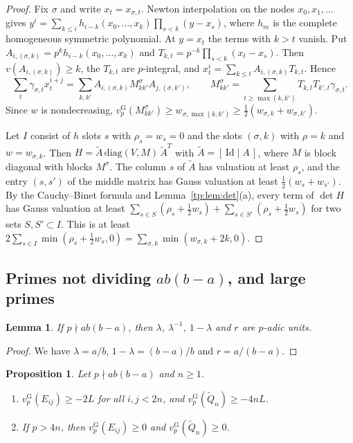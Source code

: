 \documentclass[11pt]{amsart}
\newtheorem{lemma}[theorem]{Lemma}
\newtheorem{proposition}[theorem]{Proposition}
\theoremstyle{definition}
\theoremstyle{remark}
\numberwithin{equation}{section}
\newcommand{\vG}{v_p^{\mathrm G}}
\begin{document}
\begin{proof}
Fix $\sigma$ and write $x_t=x_{\sigma,t}$. Newton interpolation on the nodes $x_0,x_1,\dots$ gives
$y^i=\sum_{k\le i}h_{i-k}(x_0,\dots,x_k)\prod_{s<k}(y-x_s)$, where $h_m$ is the complete homogeneous symmetric
polynomial. At $y=x_t$ the terms with $k>t$ vanish. Put $A_{i,(\sigma,k)}=p^kh_{i-k}(x_0,\dots,x_k)$ and
$T_{k,t}=p^{-k}\prod_{s<k}(x_t-x_s)$. Then $v(A_{i,(\sigma,k)})\ge k$, the $T_{k,t}$ are $p$-integral, and
$x_t^i=\sum_{k\le t}A_{i,(\sigma,k)}T_{k,t}$. Hence
\[
 \sum_t\gamma_{\sigma,t}x_t^{i+j}=\sum_{k,k'}A_{i,(\sigma,k)}M^\sigma_{kk'}A_{j,(\sigma,k')},\qquad
 M^\sigma_{kk'}=\sum_{t\ge\max(k,k')}T_{k,t}T_{k',t}\gamma_{\sigma,t}.
\]
Since $w$ is nondecreasing, $\vG(M^\sigma_{kk'})\ge w_{\sigma,\max(k,k')}\ge\frac12(w_{\sigma,k}+w_{\sigma,k'})$.

Let $I$ consist of $h$ slots $s$ with $\rho_s=w_s=0$ and the slots $(\sigma,k)$ with $\rho=k$ and $w=w_{\sigma,k}$. Then
$H=\tilde A\,\mathrm{diag}(V,M)\,\tilde A^{T}$ with $\tilde A=[\,\mathrm{Id}\mid A\,]$, where $M$ is block diagonal with
blocks $M^\sigma$. The column $s$ of $\tilde A$ has valuation at least $\rho_s$, and the entry $(s,s')$ of the middle
matrix has Gauss valuation at least $\frac12(w_s+w_{s'})$. By the Cauchy--Binet formula and
Lemma~\ref{tp:lem:det}(a), every term of $\det H$ has Gauss valuation at least
$\sum_{s\in S}(\rho_s+\frac12w_s)+\sum_{s\in S'}(\rho_s+\frac12w_s)$ for two sets $S,S'\subset I$. This is at least
$2\sum_{s\in I}\min(\rho_s+\frac12w_s,0)=\sum_{\sigma,k}\min(w_{\sigma,k}+2k,0)$.
\end{proof}

\subsection{Primes not dividing $ab(b-a)$, and large primes}

\begin{lemma}\label{tp:lem:units}
If $p\nmid ab(b-a)$, then $\lambda$, $\lambda^{-1}$, $1-\lambda$ and $r$ are $p$-adic units.
\end{lemma}

\begin{proof}
We have $\lambda=a/b$, $1-\lambda=(b-a)/b$ and $r=a/(b-a)$.
\end{proof}

\begin{proposition}\label{tp:prop:fallback}
Let $p\nmid ab(b-a)$ and $n\ge1$.
\begin{enumerate}[label=(\alph*)]
\item $\vG(E_{ij})\ge-2L$ for all $i,j<2n$, and $\vG(\tilde Q_n)\ge-4nL$.
\item If $p>4n$, then $\vG(E_{ij})\ge0$ and $\vG(\tilde Q_n)\ge0$.
\end{enumerate}
\end{proposition}
\end{document}
